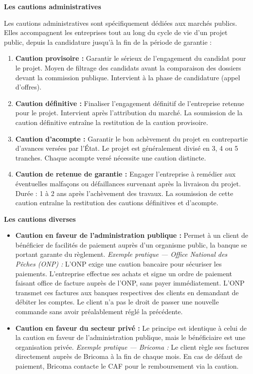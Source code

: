 \documentclass[12pt,a4paper]{report}
\begin{document}
\medskip\textbf{Les cautions administratives}

Les cautions administratives sont spécifiquement dédiées aux marchés publics. Elles accompagnent les entreprises tout au long du cycle de vie d'un projet public, depuis la candidature jusqu'à la fin de la période de garantie :

\begin{enumerate}
  \item \textbf{Caution provisoire :} Garantir le sérieux de l'engagement du candidat pour le projet. Moyen de filtrage des candidats avant la comparaison des dossiers devant la commission publique. Intervient à la phase de candidature (appel d'offres).

  \item \textbf{Caution définitive :} Finaliser l'engagement définitif de l'entreprise retenue pour le projet. Intervient après l'attribution du marché. La soumission de la caution définitive entraîne la restitution de la caution provisoire.

  \item \textbf{Caution d'acompte :} Garantir le bon achèvement du projet en contrepartie d'avances versées par l'État. Le projet est généralement divisé en 3, 4 ou 5 tranches. Chaque acompte versé nécessite une caution distincte.

  \item \textbf{Caution de retenue de garantie :} Engager l'entreprise à remédier aux éventuelles malfaçons ou défaillances survenant après la livraison du projet. Durée : 1 à 2 ans après l'achèvement des travaux. La soumission de cette caution entraîne la restitution des cautions définitives et d'acompte.
\end{enumerate}

\medskip\textbf{Les cautions diverses}

\begin{itemize}
  \item \textbf{Caution en faveur de l'administration publique :} Permet à un client de bénéficier de facilités de paiement auprès d'un organisme public, la banque se portant garante du règlement. \textit{Exemple pratique --- Office National des Pêches (ONP) :} L'ONP exige une caution bancaire pour sécuriser les paiements. L'entreprise effectue ses achats et signe un ordre de paiement faisant office de facture auprès de l'ONP, sans payer immédiatement. L'ONP transmet ces factures aux banques respectives des clients en demandant de débiter les comptes. Le client n'a pas le droit de passer une nouvelle commande sans avoir préalablement réglé la précédente.

  \item \textbf{Caution en faveur du secteur privé :} Le principe est identique à celui de la caution en faveur de l'administration publique, mais le bénéficiaire est une organisation privée. \textit{Exemple pratique --- Bricoma :} Le client règle ses factures directement auprès de Bricoma à la fin de chaque mois. En cas de défaut de paiement, Bricoma contacte le CAF pour le remboursement via la caution.
\end{itemize}
\end{document}
